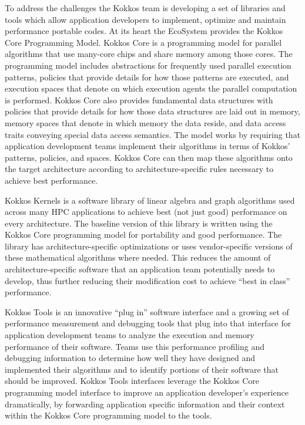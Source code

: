 To address the challenges the Kokkos team is developing a set of libraries and tools which allow application developers to implement, optimize and maintain performance portable codes. 
At its heart the EcoSystem provides the Kokkos Core Programming Model.
Kokkos Core is a programming model for parallel algorithms that use many-core chips and share memory among those cores.
The programming model includes abstractions for frequently used parallel execution patterns, policies that provide details for how those patterns are executed, and execution spaces that denote on which execution agents the parallel computation is performed. 
Kokkos Core also provides fundamental data structures with policies that provide details for how those data structures are laid out in memory, memory spaces that denote in which memory the data reside, and data access traits conveying special data access semantics.
The model works by requiring that application development teams implement their algorithms in terms of Kokkos’ patterns, policies, and spaces. 
Kokkos Core can then map these algorithms onto the target architecture according to architecture-specific rules necessary to achieve best performance.

Kokkos Kernels is a software library of linear algebra and graph algorithms used across many HPC applications to achieve best (not just good) performance on every architecture. The baseline version of this library is written using the Kokkos Core programming model for portability and good performance. The library has architecture-specific optimizations or uses vendor-specific versions of these mathematical algorithms where needed. This reduces the amount of architecture-specific software that an application team potentially needs to develop, thus further reducing their modification cost to achieve “best in class” performance. 

Kokkos Tools is an innovative “plug in” software interface and a growing set of performance measurement and debugging tools that plug into that interface for application development teams to analyze the execution and memory performance of their software. Teams use this performance profiling and debugging information to determine how well they have designed and implemented their algorithms and to identify portions of their software that should be improved. Kokkos Tools interfaces  leverage the Kokkos Core programming model interface to improve an application developer’s experience dramatically, by forwarding application specific information and their context within the Kokkos Core programming model to the tools.

